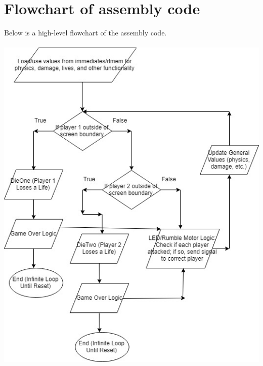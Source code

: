 \documentclass[12pt]{article} %
\begin{document}
\section{Flowchart of assembly code}
Below is a high-level flowchart of the assembly code.\\~\\
\includegraphics[scale=0.75]{flowchart}\\
\end{document}
